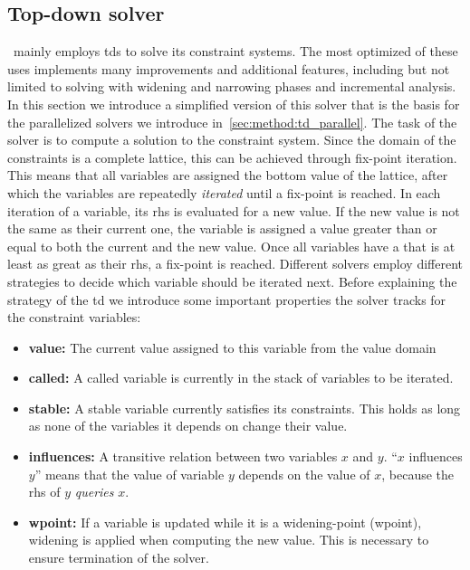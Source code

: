   \subsection{Top-down solver}
  \label{sec:background:td}
  \gob\ mainly employs \acp{td} to solve its constraint systems. The most optimized of these uses implements many improvements and additional features, including but not limited to solving with widening and narrowing phases and incremental analysis. 
  In this section we introduce a simplified version of this solver that is the basis for the parallelized solvers we introduce in~\autoref{sec:method:td_parallel}.
  The task of the solver is to compute a solution to the constraint system. Since the domain of the constraints is a complete lattice, this can be achieved through fix-point iteration. This means that all variables are assigned the bottom value of the lattice, after which the variables are repeatedly \textit{iterated} until a fix-point is reached. In each iteration of a variable, its \ac{rhs} is evaluated for a new value. If the new value is not the same as their current one, the variable is assigned a value greater than or equal to both the current and the new value. Once all variables have a that is at least as great as their \ac{rhs}, a fix-point is reached.
  Different solvers employ different strategies to decide which variable should be iterated next. Before explaining the strategy of the \ac{td} we introduce some important properties the solver tracks for the constraint variables:
  \begin{itemize}[leftmargin=*]
    \item \textbf{value:} The current value assigned to this variable from the value domain
    \item \textbf{called:} A called variable is currently in the stack of variables to be iterated.
    \item \textbf{stable:} A stable variable currently satisfies its constraints. This holds as long as none of the variables it depends on change their value.
    \item \textbf{influences:} A transitive relation between two variables $x$ and $y$. ``$x$ influences $y$'' means that the value of variable $y$ depends on the value of $x$, because the \ac{rhs} of $y$ \textit{queries} $x$.
    \item \textbf{wpoint:} If a variable is updated while it is a widening-point (wpoint), widening is applied when computing the new value. This is necessary to ensure termination of the solver.
  \end{itemize}

